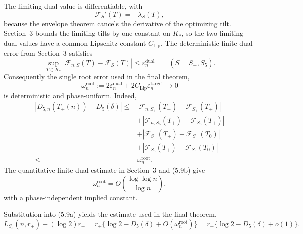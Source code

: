 \documentclass[a4paper,10pt,reqno]{amsart}
\numberwithin{equation}{section}
\theoremstyle{plain}
\theoremstyle{remark}
\begin{document}
The limiting dual value is differentiable, with
\[
  \mathcal F_S'(T)=-\lambda_S(T),
\]
because the envelope theorem cancels the derivative of the optimizing tilt.
Section~3 bounds the limiting tilts by one constant on $K_*$, so the two
limiting dual values have a common Lipschitz constant $C_{\mathrm{Lip}}$.
The deterministic finite-dual error from Section~3 satisfies
\[
  \sup_{T\in K_*}
  |\mathcal F_{n,S}(T)-\mathcal F_S(T)|
  \le\varepsilon_n^{\mathrm{dual}}
  \qquad(S=S_+,S_5).
\]
Consequently the single root error used in the final theorem,
\begin{equation*}
  \omega_n^{\mathrm{root}}
  :=2\varepsilon_n^{\mathrm{dual}}
    +2C_{\mathrm{Lip}}\varepsilon_n^{\mathrm{target}}
  \longrightarrow0
  \tag{5.9c}
\end{equation*}
is deterministic and phase-uniform. Indeed,
\[
\begin{aligned}
  |D_{5,n}(T_+(n))-D_5(\delta)|
  \le{}&
  |\mathcal F_{n,S_+}(T_+)-\mathcal F_{S_+}(T_+)|\\
  &+|\mathcal F_{n,S_5}(T_+)-\mathcal F_{S_5}(T_+)|\\
  &+|\mathcal F_{S_+}(T_+)-\mathcal F_{S_+}(T_0)|\\
  &+|\mathcal F_{S_5}(T_+)-\mathcal F_{S_5}(T_0)|\\
  \le{}&\omega_n^{\mathrm{root}}.
\end{aligned}
\]
The quantitative finite-dual estimate in Section~3 and (5.9b) give
\[
  \omega_n^{\mathrm{root}}
  =O\!\left(\frac{\log\log n}{\log n}\right),
\]
with a phase-independent implied constant.

Substitution into (5.9a) yields the estimate used in the final theorem,
\begin{equation*}
  L_{S_5}(n,r_+)+(\log 2)r_+
  =r_+\{\log 2-D_5(\delta)+O(\omega_n^{\mathrm{root}})\}
  =r_+\{\log 2-D_5(\delta)+o(1)\}.
  \tag{5.10}
\end{equation*}
\end{document}
